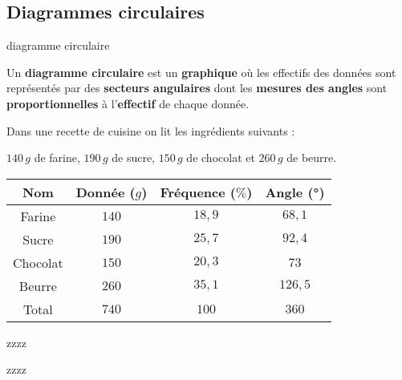 \begin{pageCours} 

\section{Diagrammes circulaires}
\begin{DefT}{diagramme circulaire}

Un \textbf{diagramme circulaire} est un \textbf{graphique} où les effectifs des données sont représentés par des \textbf{secteurs angulaires} dont les \textbf{mesures des angles} sont \textbf{proportionnelles} à l'\textbf{effectif} de chaque donnée. 

\end{DefT}

\begin{Ex}

Dans une recette de cuisine on lit les ingrédients suivants :

$140\,g$ de farine, $190\,g$ de sucre, $150\,g$ de chocolat et $260\,g$ de beurre.

\begin{tabular}{c|c|c|c}
Nom & Donnée ($g$) & Fréquence ($\%$) & Angle (°) \\\hline\hline
Farine & $140$ & $18,9$ & $68,1$ \\\hline
Sucre & $190$ & $25,7$ & $92,4$ \\\hline
Chocolat & $150$ & $20,3$ & $73$ \\\hline
Beurre & $260$ & $35,1$ & $126,5$ \\\hline
Total & $740$ & $100$ & $360$ \\
\end{tabular}


\end{Ex}


\end{pageCours}






\begin{pageAD} 



zzzz
 


zzzz


\end{pageAD}


